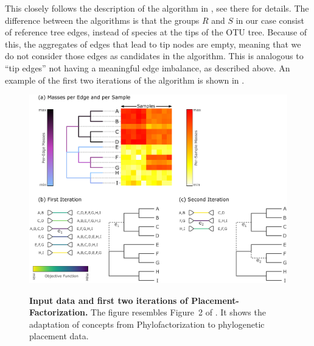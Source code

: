 This closely follows the description of the algorithm in \cite{Washburne2018,Washburne2019}, see there for details.
The difference between the algorithms is that the groups $R$ and $S$ in our case consist of reference tree edges,
instead of species at the tips of the OTU tree.
Because of this, the aggregates of edges that lead to tip nodes are empty,
meaning that we do not consider those edges as candidates in the algorithm.
This is analogous to ``tip edges'' not having a meaningful edge imbalance, as described above.
An example of the first two iterations of the algorithm is shown in .

\begin{figure}[!htbp]
    \centering
    \includegraphics[width=\linewidth]{pdf/phylofactor.pdf}
    \begin{subfigure}{0pt}
        \label{fig:phylofactor:sub:heat_tree}
    \end{subfigure}
    \begin{subfigure}{0pt}
        \label{fig:phylofactor:sub:first}
    \end{subfigure}
    \begin{subfigure}{0pt}
        \label{fig:phylofactor:sub:second}
    \end{subfigure}
    \caption[Input data and first two iterations of Placement-Factorization]{
        \textbf{Input data and first two iterations of Placement-Factorization.}
        The figure resembles Figure~2 of \cite{Washburne2017a}.
        It shows the adaptation of concepts from Phylofactorization to phylogenetic placement data.
}
\end{figure}
